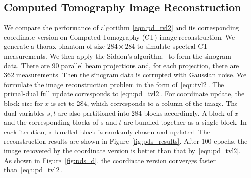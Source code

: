 \subsection{Computed Tomography Image Reconstruction}\label{sec:tv}
We compare the performance of algorithm~\eqref{eqn:pd_tvl2} and its corresponding coordinate version on Computed Tomography (CT) image reconstruction. We generate a thorax phantom of size $284\times 284$ to simulate spectral CT measurements.  We then apply the Siddon's algorithm~\cite{Siddon} to form the sinogram data. There are 90 parallel beam projections and, for each projection, there are 362 measurements. Then the sinogram data is corrupted with Gaussian noise. We formulate the image reconstruction problem in the form of~\eqref{eqn:tvl2}. The primal-dual full update corresponds to \eqref{eqn:pd_tvl2}. For coordinate update, the block size for $x$ is set to 284, which corresponds to a column of the image. The dual variables $s, t$ are also partitioned into 284 blocks accordingly. A block of $x$ and the corresponding blocks of $s$ and $t$ are bundled together as a single block. In each iteration, a bundled block is randomly chosen and updated. The reconstruction results are shown in Figure~\ref{fig:pds_results}. After 100 epochs, the image recovered by the coordinate version is better than that by~\eqref{eqn:pd_tvl2}. As shown in Figure~\ref{fig:pds_d}, the coordinate version converges faster than~\eqref{eqn:pd_tvl2}.


